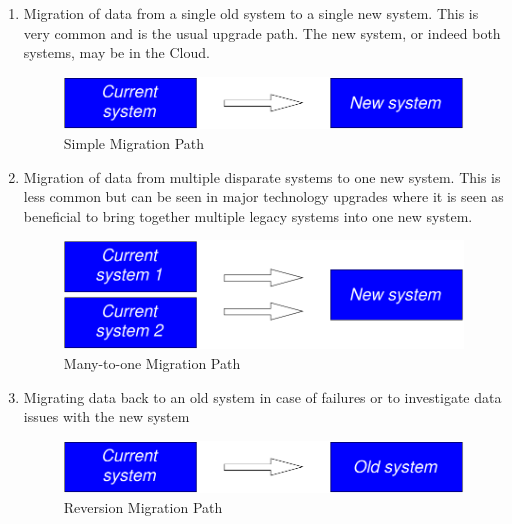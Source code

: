 \begin{enumerate}
\item Migration of data from a single old system to a single new system.
This is very common and is the usual upgrade path.
The new system, or indeed both systems, may be in the Cloud.

\begin{figure}[htbp]
  \centering
  \includegraphics[width=\textwidth/2]{images/migration1.pdf}
  \caption{Simple Migration Path}
  \label{fig:migration1}
\end{figure}

\item Migration of data from multiple disparate systems to one new system.
This is less common but can be seen in major technology upgrades where it is seen as beneficial to bring together multiple
legacy systems into one new system.

\begin{figure}[htbp]
  \centering
  \includegraphics[width=\textwidth/2]{images/migration2.pdf}
  \caption{Many-to-one Migration Path}
  \label{fig:migration2}
\end{figure}

\item Migrating data back to an old system in case of failures or to investigate data issues with the new system

\begin{figure}[htbp]
  \centering
  \includegraphics[width=\textwidth/2]{images/migration3.pdf}
  \caption{Reversion Migration Path}
  \label{fig:migration3}
\end{figure}

\end{enumerate}
%
